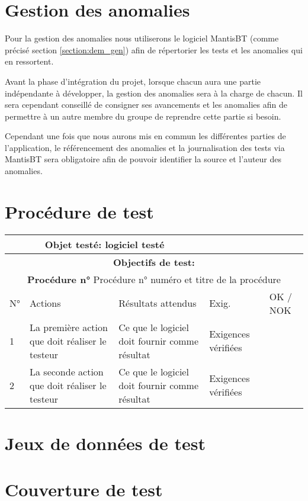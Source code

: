 \chapter{Gestion des anomalies}
Pour la gestion des anomalies nous utiliserons le logiciel MantisBT (comme précisé section
\ref{section:dem_gen}) afin de répertorier les tests et les anomalies qui en ressortent.\newline

Avant la phase d'intégration du projet, lorsque chacun aura une partie indépendante à développer,
la gestion des anomalies sera à la charge de chacun. Il sera cependant conseillé de consigner ses
avancements et les anomalies afin de permettre à un autre membre du groupe de reprendre cette
partie si besoin.\newline

Cependant une fois que nous aurons mis en commun les différentes parties de l'application, le
référencement des anomalies et la journalisation des tests via MantisBT sera obligatoire afin de
pouvoir identifier la source et l'auteur des anomalies.


\chapter{Procédure de test}

\begin{table}[!h]
        \centering
        \begin{tabular}{|m{1cm}|>{\raggedright\arraybackslash}m{4cm}|>{\raggedright\arraybackslash}m{4cm}|>{\raggedright\arraybackslash}m{4cm}|m{1cm}|}
            \hline
            \multicolumn{3}{|c|}{
                \textbf{Objet testé: } logiciel testé
            } & \multicolumn{2}{|c|}{
                \textbf{Version: } version    
            } \\
            \hline
            \multicolumn{5}{|c|}{\textbf{Objectifs de test:}} \\
            \hline
            \multicolumn{5}{|c|}{
                \textbf{Procédure n° }Procédure n° numéro et titre de la procédure
            } \\
            \hline
            N° & Actions & Résultats attendus & Exig. & OK / NOK \\
            \hline      %
            1 & La première action que doit réaliser le testeur 
              & Ce que le logiciel doit fournir comme résultat 
              & Exigences vérifiées & \\
            \hline
            2 & La seconde action que doit réaliser le testeur 
              & Ce que le logiciel doit fournir comme résultat 
              & Exigences vérifiées & \\
            \hline
        \end{tabular} 
        \label{tab:tab1}
\end{table}


\chapter{Jeux de données de test}

\chapter{Couverture de test}

